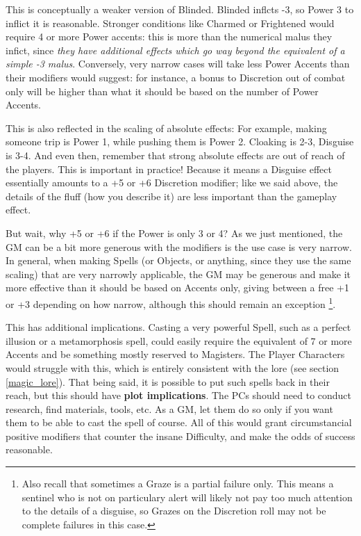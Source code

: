 This is conceptually a weaker version of Blinded. Blinded inflcts -3, so Power 3 to inflict it is reasonable. Stronger conditions like Charmed or Frightened would require 4 or more Power accents: this is more than the numerical malus they infict, since \textit{they have additional effects which go way beyond the equivalent of a simple -3 malus}. Conversely, very narrow cases will take less Power Accents than their modifiers would suggest: for instance, a bonus to Discretion out of combat only will be higher than what it should be based on the number of Power Accents.

This is also reflected in the scaling of absolute effects: For example, making someone trip is Power 1, while pushing them is Power 2. Cloaking is 2-3, Disguise is 3-4. And even then, remember that strong absolute effects are out of reach of the players. This is important in practice! Because it means a Disguise effect essentially amounts to a +5 or +6 Discretion modifier; like we said above, the details of the fluff (how you describe it) are less important than the gameplay effect.

But wait, why +5 or +6 if the Power is only 3 or 4? As we just mentioned, the GM can be a bit more generous with the modifiers is the use case is very narrow. In general, when making Spells (or Objects, or anything, since they use the same scaling) that are very narrowly applicable, the GM may be generous and make it more effective than it should be based on Accents only, giving between a free +1 or +3 depending on how narrow, although this should remain an exception \footnote{Also recall that sometimes a Graze is a partial failure only. This means a sentinel who is not on particulary alert will likely not pay too much attention to the details of a disguise, so Grazes on the Discretion roll may not be complete failures in this case.}. 

This has additional implications. Casting a very powerful Spell, such as a perfect illusion or a metamorphosis spell, could easily require the equivalent of 7 or more Accents and be something mostly reserved to Magisters. The Player Characters would struggle with this, which is entirely consistent with the lore (see section \ref{magic_lore}). That being said, it is possible to put such spells back in their reach, but this should have \textbf{plot implications}. The PCs should need to conduct research, find materials, tools, etc. As a GM, let them do so only if you want them to be able to cast the spell of course. All of this would grant circumstancial positive modifiers that counter the insane Difficulty, and make the odds of success reasonable.

